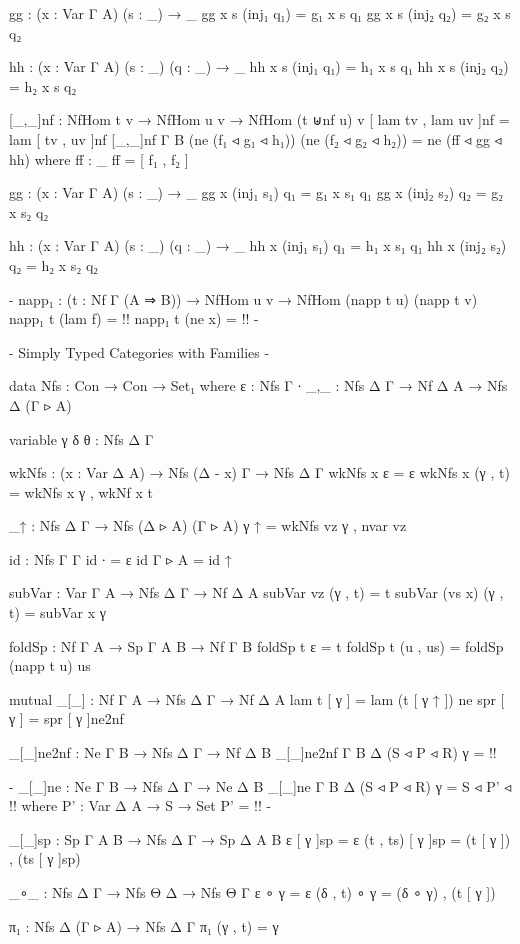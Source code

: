 \begin{code}
  gg : (x : Var Γ A) (s : _) → _
  gg x s (inj₁ q₁) = g₁ x s q₁
  gg x s (inj₂ q₂) = g₂ x s q₂

  hh : (x : Var Γ A) (s : _) (q : _) → _
  hh x s (inj₁ q₁) = h₁ x s q₁
  hh x s (inj₂ q₂) = h₂ x s q₂

[_,_]nf : NfHom t v → NfHom u v → NfHom (t ⊎nf u) v
[ lam tv , lam uv ]nf = lam [ tv , uv ]nf
[_,_]nf {Γ} {B} (ne (f₁ ◃ g₁ ◃ h₁)) (ne (f₂ ◃ g₂ ◃ h₂)) = ne (ff ◃ gg ◃ hh)
  where
  ff : _
  ff = [ f₁ , f₂ ]

  gg : (x : Var Γ A) (s : _) → _
  gg x (inj₁ s₁) q₁ = g₁ x s₁ q₁
  gg x (inj₂ s₂) q₂ = g₂ x s₂ q₂

  hh : (x : Var Γ A) (s : _) (q : _) → _
  hh x (inj₁ s₁) q₁ = h₁ x s₁ q₁
  hh x (inj₂ s₂) q₂ = h₂ x s₂ q₂

{-
napp₁ : (t : Nf Γ (A ⇒ B))
  → NfHom u v → NfHom (napp t u) (napp t v)
napp₁ t (lam f) = {!!}
napp₁ t (ne x) = {!!}
-}

{- Simply Typed Categories with Families -}

data Nfs : Con → Con → Set₁ where
  ε   : Nfs Γ ∙
  _,_ : Nfs Δ Γ → Nf Δ A → Nfs Δ (Γ ▹ A)

variable γ δ θ : Nfs Δ Γ

wkNfs : (x : Var Δ A) → Nfs (Δ - x) Γ → Nfs Δ Γ
wkNfs x ε = ε
wkNfs x (γ , t) = wkNfs x γ , wkNf x t

_↑ : Nfs Δ Γ → Nfs (Δ ▹ A) (Γ ▹ A)
γ ↑ = wkNfs vz γ , nvar vz

id : Nfs Γ Γ
id {∙} = ε
id {Γ ▹ A} = id ↑

subVar : Var Γ A → Nfs Δ Γ → Nf Δ A
subVar vz (γ , t) = t
subVar (vs x) (γ , t) = subVar x γ

foldSp : Nf Γ A → Sp Γ A B → Nf Γ B
foldSp t ε = t
foldSp t (u , us) = foldSp (napp t u) us

mutual
  _[_] : Nf Γ A → Nfs Δ Γ → Nf Δ A
  lam t [ γ ] = lam (t [ γ ↑ ])
  ne spr [ γ ] = spr [ γ ]ne2nf

  _[_]ne2nf : Ne Γ B → Nfs Δ Γ → Nf Δ B
  _[_]ne2nf {Γ} {B} {Δ} (S ◃ P ◃ R) γ = {!!}

{-
  _[_]ne : Ne Γ B → Nfs Δ Γ → Ne Δ B
  _[_]ne {Γ} {B} {Δ} (S ◃ P ◃ R) γ = S ◃ P' ◃ {!!}
    where
    P' : Var Δ A → S → Set
    P' = {!!}
-}

  _[_]sp : Sp Γ A B → Nfs Δ Γ → Sp Δ A B
  ε [ γ ]sp = ε
  (t , ts) [ γ ]sp = (t [ γ ]) , (ts [ γ ]sp)

_∘_ : Nfs Δ Γ → Nfs Θ Δ → Nfs Θ Γ
ε ∘ γ = ε
(δ , t) ∘ γ = (δ ∘ γ) , (t [ γ ])

π₁ : Nfs Δ (Γ ▹ A) → Nfs Δ Γ
π₁ (γ , t) = γ


\end{code}
